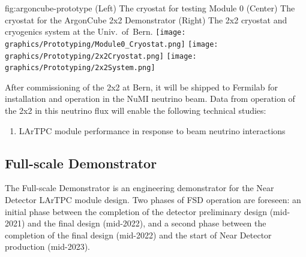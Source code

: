 \begin{dunefigure}{fig:argoncube-prototype}
{(Left) The cryostat for testing Module 0 (Center) The cryostat for the ArgonCube 2x2 Demonstrator (Right) The 2x2 cryostat and cryogenics system at the Univ.~of~Bern.}
\texttt{[image: graphics/Prototyping/Module0\_Cryostat.png]}
\texttt{[image: graphics/Prototyping/2x2Cryostat.png]}
\texttt{[image: graphics/Prototyping/2x2System.png]}
\end{dunefigure}

After commissioning of the 2x2 at Bern, it will be shipped to Fermilab for installation and operation in the NuMI neutrino beam.  
Data from operation of the 2x2 in this neutrino flux will enable the following technical studies:
\begin{enumerate}
    \item LArTPC module performance in response to beam neutrino interactions
\end{enumerate}

\subsection{Full-scale Demonstrator}

The Full-scale Demonstrator is an engineering demonstrator for the Near Detector LArTPC module design.  
Two phases of FSD operation are foreseen: an initial phase between the completion of the detector preliminary design (mid-2021) and the final design (mid-2022), and a second phase between the completion of the final design (mid-2022) and the start of Near Detector production (mid-2023).


